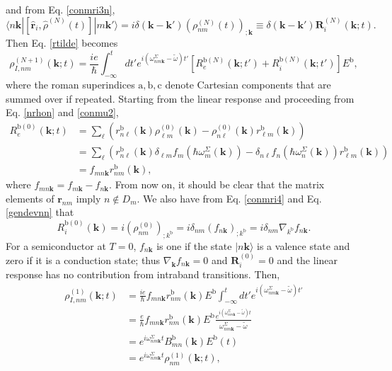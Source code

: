 and from Eq. \eqref{conmri3n},
\begin{equation}\label{conmri4}
\langle n\mathbf{k}|
[\hat{\mathbf{r}}_i,\hat{\rho}^{(N)}(t)]
|m\mathbf{k}'\rangle
=i \delta(\mathbf{k}-\mathbf{k}') (\rho^{(N)}_{nm}(t))_{;\mathbf{k}}
\equiv \delta(\mathbf{k}-\mathbf{k}')\mathbf{R}_i^{(N)}(\mathbf{k};t)
.
\end{equation}
Then Eq. \eqref{rtilde} becomes
\begin{equation}\label{rtilde2}
\rho^{(N+1)}_{I,nm}(\mathbf{k};t)
=\frac{ie}{\hbar}\int_{-\infty}^t dt'
e^{i(\omega^\Sigma_{nm\mathbf{k}}-\tilde{\omega})t'}
\left[R_e^{\mathrm{b}(N)}(\mathbf{k};t')+R_i^{\mathrm{b}(N)}(\mathbf{k};t')\right]E^{\mathrm{b}}
,
\end{equation}
where the roman superindices
$\mathrm{a},\mathrm{b},\mathrm{c}$ denote Cartesian components that are summed over if repeated.
Starting from the linear response and proceeding from Eq. \eqref{nrhon} and  \eqref{conmu2},
\begin{align}\label{R0e}
R_e^{\mathrm{b}(0)}(\mathbf{k};t)
&=
\sum_{\ell}
\left(
r^{\mathrm{b}}_{n\ell}(\mathbf{k})
\rho^{(0)}_{\ell m}(\mathbf{k})
-
\rho^{(0)}_{n\ell}(\mathbf{k})
r^{\mathrm{b}}_{\ell m}(\mathbf{k})
\right)
\nonumber \\
&=
\sum_{\ell}
\left(
r^{\mathrm{b}}_{n\ell}(\mathbf{k})
\delta_{\ell m}f_m(\hbar\omega^\Sigma_m(\mathbf{k}))
-
\delta_{n\ell}f_n(\hbar\omega^{\Sigma}_{n}(\mathbf{k}))
r^{\mathrm{b}}_{\ell m}(\mathbf{k})
\right)
\nonumber \\
&=
f_{mn\mathbf{k}}
r^{\mathrm{b}}_{nm}(\mathbf{k})
,
\end{align}
where $f_{mn\mathbf{k}}=f_{m\mathbf{k}}-f_{n\mathbf{k}}$.
From now on,
it should be clear that the matrix elements of $\mathbf{r}_{nm}$ imply
$n\notin D_m$.
We also have from Eq. \eqref{conmri4} and Eq. \eqref{gendevnn} that
\begin{equation}\label{R0i}
R_i^{\mathrm{b}(0)}(\mathbf{k})=i(\rho^{(0)}_{nm})_{;k^{\mathrm{b}}}=i\delta_{nm}(f_{n\mathbf{k}})_{;k^{\mathrm{b}}}=i\delta_{nm}\nabla_{k^{\mathrm{b}}} f_{n\mathbf{k}}
.
\end{equation}
For a semiconductor at $T=0$, $f_{n\mathbf{k}}$ is one if the state
$|n\mathbf{k}\rangle$ is a valence state and zero if it is a conduction state; 
thus $\nabla_\mathbf{k} f_{n\mathbf{k}}=0$ and $\mathbf{R}_i^{(0)}=0$ and
the linear response has no contribution from
intraband transitions.
 Then,
\begin{align}\label{rtilde2n}
\rho^{(1)}_{I,nm}(\mathbf{k};t)
&=\frac{ie}{\hbar}
f_{mn\mathbf{k}}
r^{\mathrm{b}}_{nm}(\mathbf{k})E^{\mathrm{b}}
\int_{-\infty}^t dt'
e^{i(\omega^\Sigma_{nm\mathbf{k}}-\tilde{\omega})t'}
\nonumber \\
&=\frac{e}{\hbar}
f_{mn\mathbf{k}}
r^{\mathrm{b}}_{nm}(\mathbf{k})E^{\mathrm{b}}
\frac{e^{i(\omega^\Sigma_{nm\mathbf{k}}-\tilde{\omega})t}}
{\omega^\Sigma_{nm\mathbf{k}}-\tilde{\omega}}
\nonumber \\
&=
e^{i\omega^\Sigma_{nm\mathbf{k}}t}
B^{\mathrm{b}}_{mn}(\mathbf{k})E^{\mathrm{b}}(t)
\nonumber \\
&=
e^{i\omega^\Sigma_{nm\mathbf{k}}t}
\rho^{(1)}_{nm}(\mathbf{k};t)
,
\end{align}
